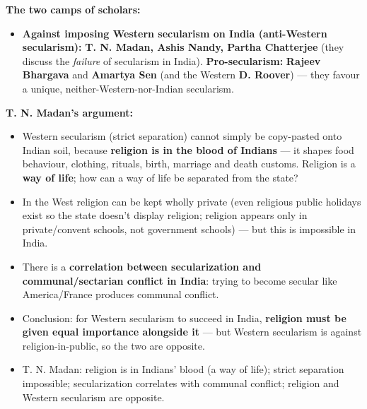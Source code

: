 \begin{CriticalPoint}
\textbf{The two camps of scholars:}
\begin{itemize}
\item \textbf{Against imposing Western secularism on India (anti-Western secularism):} \textbf{T. N. Madan, Ashis Nandy, Partha Chatterjee} (they discuss the \textit{failure} of secularism in India). \textbf{Pro-secularism:} \textbf{Rajeev Bhargava} and \textbf{Amartya Sen} (and the Western \textbf{D. Roover}) --- they favour a unique, neither-Western-nor-Indian secularism.
\end{itemize}
\end{CriticalPoint}

\begin{DataFact}
\textbf{T. N. Madan's argument:}
\begin{itemize}
\item Western secularism (strict separation) cannot simply be copy-pasted onto Indian soil, because \textbf{religion is in the blood of Indians} --- it shapes food behaviour, clothing, rituals, birth, marriage and death customs. Religion is a \textbf{way of life}; how can a way of life be separated from the state?
\item In the West religion can be kept wholly private (even religious public holidays exist so the state doesn't display religion; religion appears only in private/convent schools, not government schools) --- but this is impossible in India.
\item There is a \textbf{correlation between secularization and communal/sectarian conflict in India}: trying to become secular like America/France produces communal conflict.
\item Conclusion: for Western secularism to succeed in India, \textbf{religion must be given equal importance alongside it} --- but Western secularism is against religion-in-public, so the two are opposite.
\end{itemize}
\end{DataFact}

\begin{QuickRevision}
\begin{itemize}
\item T. N. Madan: religion is in Indians' blood (a way of life); strict separation impossible; secularization correlates with communal conflict; religion and Western secularism are opposite.
\end{itemize}
\end{QuickRevision}

